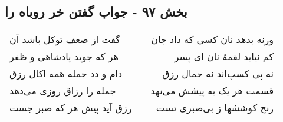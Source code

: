 \begin{center}
\section*{بخش ۹۷ - جواب گفتن خر روباه را}
\label{sec:sh097}
\begin{longtable}{l p{0.5cm} r}
گفت از ضعف توکل باشد آن
&&
ورنه بدهد نان کسی که داد جان
\\
هر که جوید پادشاهی و ظفر
&&
کم نیاید لقمهٔ نان ای پسر
\\
دام و دد جمله همه اکال رزق
&&
نه پی کسپ‌اند نه حمال رزق
\\
جمله را رزاق روزی می‌دهد
&&
قسمت هر یک به پیشش می‌نهد
\\
رزق آید پیش هر که صبر جست
&&
رنج کوششها ز بی‌صبری تست
\\
\end{longtable}
\end{center}
